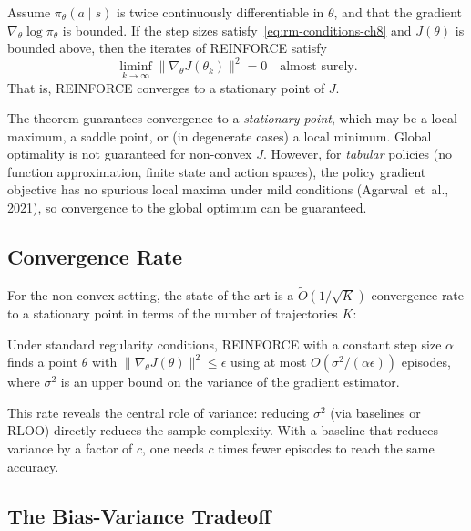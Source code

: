 \begin{theorem}
\label{thm:reinforce-convergence}
Assume $\pi_\theta(a \mid s)$ is twice continuously differentiable in $\theta$, and that the gradient $\nabla_\theta \log \pi_\theta$ is bounded.  If the step sizes satisfy~\eqref{eq:rm-conditions-ch8} and $J(\theta)$ is bounded above, then the iterates of REINFORCE satisfy
\[
\liminf_{k \to \infty} \|\nabla_\theta J(\theta_k)\|^2 = 0 \quad \text{almost surely.}
\]
That is, REINFORCE converges to a stationary point of $J$.
\end{theorem}

The theorem guarantees convergence to a \emph{stationary point}, which may be a local maximum, a saddle point, or (in degenerate cases) a local minimum.  Global optimality is not guaranteed for non-convex $J$.  However, for \emph{tabular} policies (no function approximation, finite state and action spaces), the policy gradient objective has no spurious local maxima under mild conditions (Agarwal~et~al., 2021), so convergence to the global optimum can be guaranteed.

\subsection{Convergence Rate}

For the non-convex setting, the state of the art is a $\tilde O(1/\sqrt{K})$ convergence rate to a stationary point in terms of the number of trajectories $K$:

\begin{theorem}
\label{thm:reinforce-rate}
Under standard regularity conditions, REINFORCE with a constant step size $\alpha$ finds a point $\theta$ with $\|\nabla_\theta J(\theta)\|^2 \leq \epsilon$ using at most $O(\sigma^2 / (\alpha \epsilon))$ episodes, where $\sigma^2$ is an upper bound on the variance of the gradient estimator.
\end{theorem}

This rate reveals the central role of variance: reducing $\sigma^2$ (via baselines or RLOO) directly reduces the sample complexity.  With a baseline that reduces variance by a factor of $c$, one needs $c$ times fewer episodes to reach the same accuracy.

\subsection{The Bias-Variance Tradeoff}

